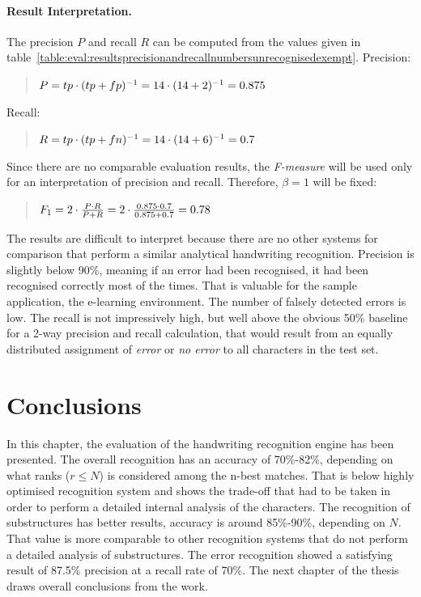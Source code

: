 \paragraph{Result Interpretation.}
The precision \(P\) and recall \(R\) can be computed from the values given in 
table~\ref{table:eval:resultsprecisionandrecallnumbersunrecognisedexempt}.
Precision:
\begin{quote}
\(
P=tp \cdot (tp+fp)^{-1} \\
= 14 \cdot (14+2)^{-1} \\
= 0.875
\)
\end{quote}
Recall:
\begin{quote}
\(
R=tp \cdot (tp+fn)^{-1} \\
=14 \cdot (14+6)^{-1} \\
=0.7
\)  
\end{quote}
Since there are no comparable evaluation results, 
the \emph{F-measure} will be used only for an interpretation of precision and 
recall. Therefore, \(\beta = 1\) will
be fixed:
\begin{quote}
\(
F_{1} = 2 \cdot \frac{P \cdot R }{P + R} \\
 = 2 \cdot \frac{0.875 \cdot 0.7 }{0.875 + 0.7} \\
 = 0.78
\)
\end{quote}
The results are difficult to interpret because there are no other systems for 
comparison that perform a similar analytical handwriting recognition.
Precision is slightly below 90\%, meaning if an error had been recognised,
it had been recognised correctly most of the times.
That is valuable for the sample application, the e-learning environment.
The number of falsely detected errors is low.
The recall is not impressively high, 
but well above the obvious 50\% baseline for a 2-way precision 
and recall calculation, that would result from an equally distributed assignment 
of \emph{error} or \emph{no error} to all characters in the test set.

\section{Conclusions}
\label{sec:eval:conclusions}

In this chapter, the evaluation of the handwriting recognition engine has 
been presented. The overall recognition has an accuracy of 70\%-82\%,
depending on what ranks (\(r \leq N\)) is considered among the n-best matches.
That is below highly optimised recognition system and shows the trade-off that
had to be taken in order to perform a detailed internal analysis of the 
characters.
The recognition of substructures has better results, accuracy is around
85\%-90\%, depending on \(N\). That value is more comparable to other 
recognition systems that do not perform a detailed analysis of substructures.
The error recognition showed a satisfying result of 87.5\% precision at a recall 
rate of 70\%.
The next chapter of the thesis draws overall conclusions from the work.
